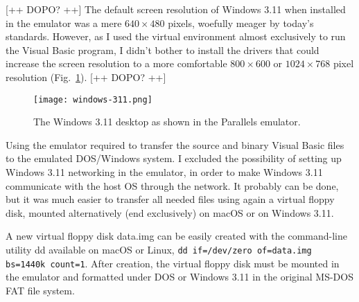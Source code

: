 [++ DOPO? ++] The default screen resolution of Windows 3.11 when installed in the emulator was a mere $640  \times 480$ pixels,  woefully meager by today's standards.
However, as I used the virtual environment almost exclusively to run the Visual Basic program, I didn't bother to install the drivers that could increase the screen resolution to a more comfortable $800 \times 600$ or $1024 \times 768$ pixel resolution (Fig.~\ref{fig:windows-311}). [++ DOPO? ++]


\begin{figure}[tbh]
	\centering
	\texttt{[image: windows-311.png]}
	\caption{The Windows 3.11 desktop as shown in the Parallels emulator.}
	\label{fig:windows-311}
\end{figure}



Using the emulator required to transfer the source and binary Visual Basic files to the emulated DOS/Windows system.
I excluded the possibility of setting up Windows 3.11 networking in the emulator, in order to make Windows 3.11 communicate with the host OS through the network.
It probably can be done, but it was much easier to transfer all needed files using again a virtual floppy disk, mounted alternatively (end exclusively) on macOS or on Windows 3.11.

A new virtual floppy disk \textsf{data.img} can be easily created with the command-line utility \textsf{dd} available on macOS or Linux, \lstinline[columns=fixed]{dd if=/dev/zero of=data.img bs=1440k count=1}. After creation, the virtual floppy disk must be mounted in the emulator and formatted under DOS or Windows 3.11 in the original MS-DOS FAT file system.



